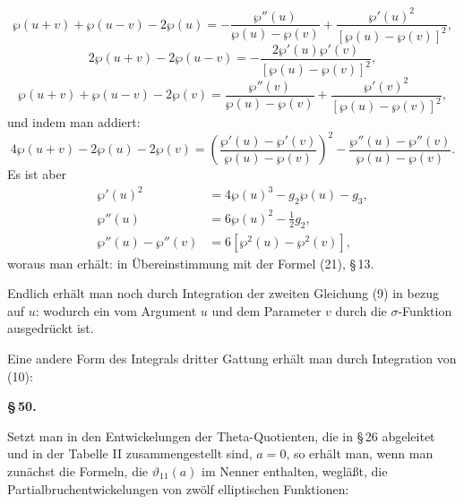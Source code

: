
\[
\wp(u+v) + \wp(u-v) - 2\wp(u) = -\dfrac{\wp''(u)}{\wp(u)-\wp(v)} + \dfrac{\wp'(u)^2}{[\wp(u)-\wp(v)]^2},
\]
\[
2\wp(u+v) - 2\wp(u-v) = -\dfrac{2\wp'(u)\wp'(v)}{[\wp(u)-\wp(v)]^2},
\]
\[
\wp(u+v) + \wp(u-v) - 2\wp(v) = \dfrac{\wp''(v)}{\wp(u)-\wp(v)} + \dfrac{\wp'(v)^2}{[\wp(u)-\wp(v)]^2},
\]
und indem man addiert:
\[
4\wp(u+v) - 2\wp(u) - 2\wp(v) = \left(\dfrac{\wp'(u)-\wp'(v)}{\wp(u)-\wp(v)}\right)^2 - \dfrac{\wp''(u)-\wp''(v)}{\wp(u)-\wp(v)}.
\]
Es ist aber
\[
\begin{aligned}
\wp'(u)^2 &= 4\wp(u)^3 - g_2\wp(u) - g_3, \\
\wp''(u) &= 6\wp(u)^2 - \tfrac{1}{2}g_2, \\
\wp''(u) - \wp''(v) &= 6\left[\wp^2(u) - \wp^2(v)\right],
\end{aligned}
\]
woraus man erhält:
in Übereinstimmung mit der Formel (21), \S\,13.

Endlich erhält man noch durch Integration der zweiten
Gleichung (9) in bezug auf $u$:
wodurch ein  vom Argument $u$
und dem Parameter $v$ durch die $\sigma$-Funktion ausgedrückt ist.

Eine andere Form des Integrals dritter Gattung erhält man
durch Integration von (10):

\begin{center}
\textbf{\S\,50. }
\end{center}

Setzt man in den Entwickelungen der Theta-Quotienten, die
in \S\,26 abgeleitet und in der Tabelle II zusammengestellt sind,
$a=0$, so erhält man, wenn man zunächst die Formeln, die
$\vartheta_{11}(a)$ im Nenner enthalten, wegläßt, die Partialbruchentwickelungen
 von zwölf elliptischen Funktionen:
